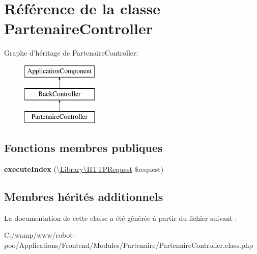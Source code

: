\hypertarget{class_applications_1_1_frontend_1_1_modules_1_1_partenaire_1_1_partenaire_controller}{\section{Référence de la classe Partenaire\+Controller}
\label{class_applications_1_1_frontend_1_1_modules_1_1_partenaire_1_1_partenaire_controller}
}
Graphe d'héritage de Partenaire\+Controller\+:\begin{figure}[H]
\begin{center}
\leavevmode
\includegraphics[height=3.000000cm]{class_applications_1_1_frontend_1_1_modules_1_1_partenaire_1_1_partenaire_controller}
\end{center}
\end{figure}
\subsection*{Fonctions membres publiques}
\begin{DoxyCompactItemize}
\item 
\hypertarget{class_applications_1_1_frontend_1_1_modules_1_1_partenaire_1_1_partenaire_controller_ac9c6fe801e9ac09e4a395ad64c76ed04}{{\bfseries execute\+Index} (\textbackslash{}\hyperlink{class_library_1_1_h_t_t_p_request}{Library\textbackslash{}\+H\+T\+T\+P\+Request} \$request)}\label{class_applications_1_1_frontend_1_1_modules_1_1_partenaire_1_1_partenaire_controller_ac9c6fe801e9ac09e4a395ad64c76ed04}

\end{DoxyCompactItemize}
\subsection*{Membres hérités additionnels}


La documentation de cette classe a été générée à partir du fichier suivant \+:\begin{DoxyCompactItemize}
\item 
C\+:/wamp/www/robot-\/poo/\+Applications/\+Frontend/\+Modules/\+Partenaire/Partenaire\+Controller.\+class.\+php\end{DoxyCompactItemize}
